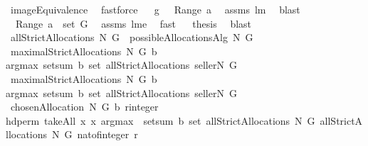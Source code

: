 \begin{isabellebody}
\ imageEquivalence\ \isamarkupfalse%
\ fastforce\isanewline
{}\isamarkupfalse%
\ \isamarkupfalse%
\ {\isachardoublequoteopen}g\ {\isasymin}\ {\isasymUnion}\ Range\ {\isacharquery}a{\isachardoublequoteclose}\ \isamarkupfalse%
\ assms\ lm{}{}{}\ \isamarkupfalse%
\ blast\ \isanewline
{}\isamarkupfalse%
\ \isamarkupfalse%
\ {\isachardoublequoteopen}{\isasymUnion}\ Range\ {\isacharquery}a\ {\isasymsubseteq}\ set\ G{\isachardoublequoteclose}\ \isamarkupfalse%
\ assms{\isacharparenleft}{}{\isacharcomma}{}{\isacharcomma}{}{\isacharparenright}\ lm{}{}e\ \isamarkupfalse%
\ fast\isanewline
{}\isamarkupfalse%
\ \isamarkupfalse%
\ {\isacharquery}thesis\ \isamarkupfalse%
\ blast\isanewline
{}\isamarkupfalse%
%
\endisatagproof
{\isafoldproof}%
%
\isadelimproof
\isanewline
%
\endisadelimproof
\isanewline
{}\isamarkupfalse%
\ {\isachardoublequoteopen}allStrictAllocations\ N\ G\ {\isacharequal}{\isacharequal}\ possibleAllocationsAlg\ N\ G{\isachardoublequoteclose}\isanewline
{}\isamarkupfalse%
\ {\isachardoublequoteopen}maximalStrictAllocations\ N\ G\ b{\isacharequal}{\isacharequal}\isanewline
argmax\ {\isacharparenleft}setsum\ b{\isacharparenright}\ {\isacharparenleft}set\ {\isacharparenleft}allStrictAllocations\ {\isacharparenleft}{\isacharbraceleft}seller{\isacharbraceright}{\isasymunion}N{\isacharparenright}\ G{\isacharparenright}{\isacharparenright}{\isachardoublequoteclose}\isanewline
\isanewline
{}\isamarkupfalse%
\ {\isachardoublequoteopen}maximalStrictAllocations{}\ N\ G\ b{\isacharequal}\isanewline
argmax\ {\isacharparenleft}setsum\ b{\isacharparenright}\ {\isacharparenleft}set\ {\isacharparenleft}allStrictAllocations\ {\isacharparenleft}{\isacharbraceleft}seller{\isacharbraceright}{\isasymunion}N{\isacharparenright}\ G{\isacharparenright}{\isacharparenright}{\isachardoublequoteclose}\isanewline
\isanewline
{}\isamarkupfalse%
\ {\isachardoublequoteopen}chosenAllocation\ N\ G\ b\ {\isacharparenleft}r{\isacharcolon}{\isacharcolon}integer{\isacharparenright}\ {\isacharequal}{\isacharequal}\ \isanewline
hd{\isacharparenleft}perm{}\ {\isacharparenleft}takeAll\ {\isacharparenleft}{\isacharpercent}x{\isachardot}\ x{\isasymin}\ {\isacharparenleft}argmax\ {\isasymcirc}\ setsum{\isacharparenright}\ b\ {\isacharparenleft}set\ {\isacharparenleft}allStrictAllocations\ N\ G{\isacharparenright}{\isacharparenright}{\isacharparenright}\ {\isacharparenleft}allStrictAllocations\ N\ G{\isacharparenright}{\isacharparenright}\ {\isacharparenleft}nat{\isacharunderscore}of{\isacharunderscore}integer\ r{\isacharparenright}{\isacharparenright}{\isachardoublequoteclose}\isanewline

\end{isabellebody}
